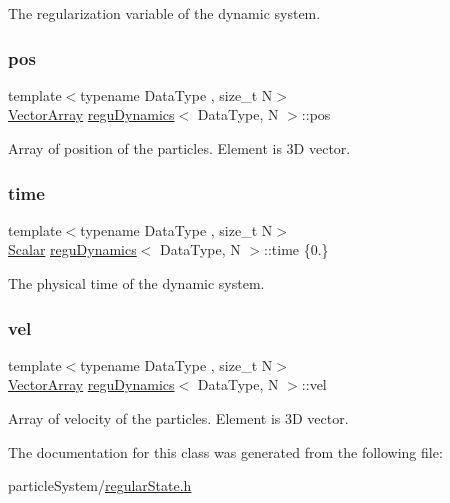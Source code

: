 The regularization variable of the dynamic system. 

\mbox{\label{classregu_dynamics_a5e39085954d2dd9bcaa545a00880f442}} 
\subsubsection{\texorpdfstring{pos}{pos}}
{\footnotesize\ttfamily template$<$typename Data\+Type , size\+\_\+t N$>$ \\
\mbox{\hyperlink{classregu_dynamics_a86a05253d927e1716f3401e887aa5c8e}{Vector\+Array}} \mbox{\hyperlink{classregu_dynamics}{regu\+Dynamics}}$<$ Data\+Type, N $>$\+::pos}



Array of position of the particles. Element is 3D vector. 

\mbox{\label{classregu_dynamics_a05e287cf3f87cba248f69b5ff97a054d}} 
\subsubsection{\texorpdfstring{time}{time}}
{\footnotesize\ttfamily template$<$typename Data\+Type , size\+\_\+t N$>$ \\
\mbox{\hyperlink{classregu_dynamics_a359c55370b4dee032396f0df86ad5fab}{Scalar}} \mbox{\hyperlink{classregu_dynamics}{regu\+Dynamics}}$<$ Data\+Type, N $>$\+::time \{0.\}}



The physical time of the dynamic system. 

\mbox{\label{classregu_dynamics_abf1176124ddfd429310f804491239801}} 
\subsubsection{\texorpdfstring{vel}{vel}}
{\footnotesize\ttfamily template$<$typename Data\+Type , size\+\_\+t N$>$ \\
\mbox{\hyperlink{classregu_dynamics_a86a05253d927e1716f3401e887aa5c8e}{Vector\+Array}} \mbox{\hyperlink{classregu_dynamics}{regu\+Dynamics}}$<$ Data\+Type, N $>$\+::vel}



Array of velocity of the particles. Element is 3D vector. 



The documentation for this class was generated from the following file\+:\begin{DoxyCompactItemize}
\item 
particle\+System/\mbox{\hyperlink{regular_state_8h}{regular\+State.\+h}}\end{DoxyCompactItemize}
